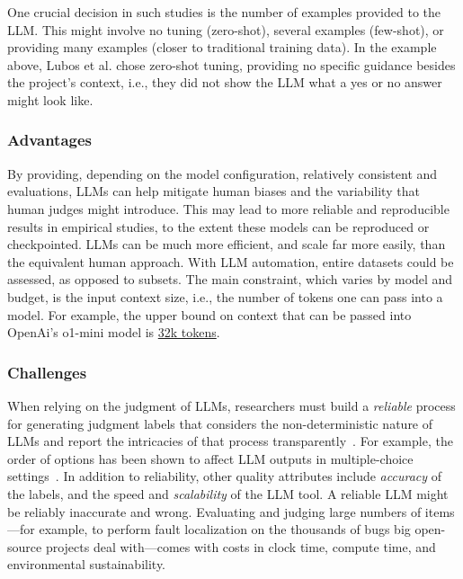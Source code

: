 One crucial decision in such studies is the number of examples provided to the LLM.
This might involve no tuning (zero-shot), several examples (few-shot), or providing many examples (closer to traditional training data).
In the example above, Lubos et al. chose zero-shot tuning, providing no specific guidance besides the project's context, i.e., they did not show the LLM what a yes or no answer might look like. 

\subsubsection{Advantages}

By providing, depending on the model configuration, relatively consistent and evaluations, LLMs can help mitigate human biases and the variability that human judges might introduce.
This may lead to more reliable and reproducible results in empirical studies, to the extent these models can be reproduced or checkpointed.
LLMs can be much more efficient, and scale far more easily, than the equivalent human approach. With LLM automation, entire datasets could be assessed, as opposed to subsets. The main constraint, which varies by model and budget, is the input context size, i.e., the number of tokens one can pass into a model. For example, the upper bound on context that can be passed into OpenAi's \textsf{o1-mini} model is \href{https://help.openai.com/en/articles/9855712-openai-o1-models-faq-chatgpt-enterprise-and-edu}{32k tokens}. 

\subsubsection{Challenges}

When relying on the judgment of LLMs, researchers must build a \textit{reliable} process for generating judgment labels that considers the non-deterministic nature of LLMs and report the intricacies of that process transparently~\cite{DBLP:journals/corr/abs-2412-12509}. For example, the order of options has been shown to affect LLM outputs in multiple-choice settings~\cite{DBLP:conf/naacl/PezeshkpourH24}. 
In addition to reliability, other quality attributes include \textit{accuracy} of the labels, and the speed and \textit{scalability} of the LLM tool. 
A reliable LLM might be reliably inaccurate and wrong. 
Evaluating and judging large numbers of items---for example, to perform fault localization on the thousands of bugs big open-source projects deal with---comes with costs in clock time, compute time, and environmental sustainability.

